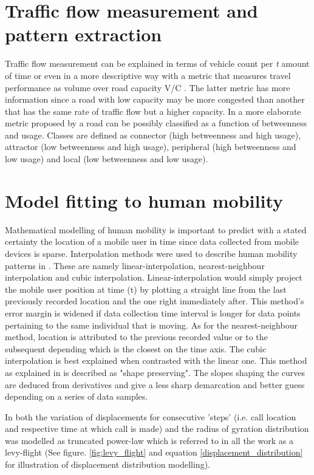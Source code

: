 \documentclass[12pt, a4paper]{report}
\theoremstyle{definition}
\theoremstyle{definition}%
\theoremstyle{definition}%
\theoremstyle{definition}%
\theoremstyle{definition}%
\theoremstyle{definition}%
\begin{document}
\section{Traffic flow measurement and pattern extraction}
Traffic flow measurement can be explained in terms of vehicle count per \textit{t} amount of time or even in a more descriptive way with a metric that measures travel performance as volume over road capacity V/C \cite{Toole2015}. The latter metric has more information since a road with low capacity may be more congested than another that has the same rate of traffic flow but a higher capacity. In a more elaborate metric proposed by \cite{Toole2015} a road can be possibly classified as a function of betweenness and usage. Classes are defined as connector (high betweenness and high usage), attractor (low betweenness and high usage), peripheral (high betweenness and low usage) and local (low betweenness and low usage).


\section{Model fitting to human mobility} \label{section:human_mobility_modelling}
Mathematical modelling of human mobility is important to predict with a stated certainty the location of a mobile user in time since data collected from mobile devices is sparse. Interpolation methods were used to describe human mobility patterns in \cite{Hoteit2014}. These are namely linear-interpolation, nearest-neighbour interpolation and cubic interpolation. Linear-interpolation would simply project the mobile user position at time (t) by plotting a straight line from the last previously recorded location and the one right immediately after. This method's error margin is widened if data collection time interval is longer for data points pertaining to the same individual that is moving. As for the nearest-neighbour method, location is attributed to the previous recorded value or to the subsequent depending which is the closest on the time axis. The cubic interpolation is best explained when contrasted with the linear one. This method as explained in \cite{Hoteit2014}  is described as "shape preserving". The slopes shaping the curves are deduced from derivatives and give a less sharp demarcation and better guess depending on a series of data samples.

In \cite{Gonzalez2008} both the variation of displacements for consecutive 'steps' (i.e. call location and respective time at which call is made) and the radius of gyration distribution was modelled as truncated power-law which is referred to in all the work as a levy-flight (See figure. \ref{fig:levy_flight} and equation \ref{displacement_distribution} for illustration of displacement distribution modelling). 
\end{document}
